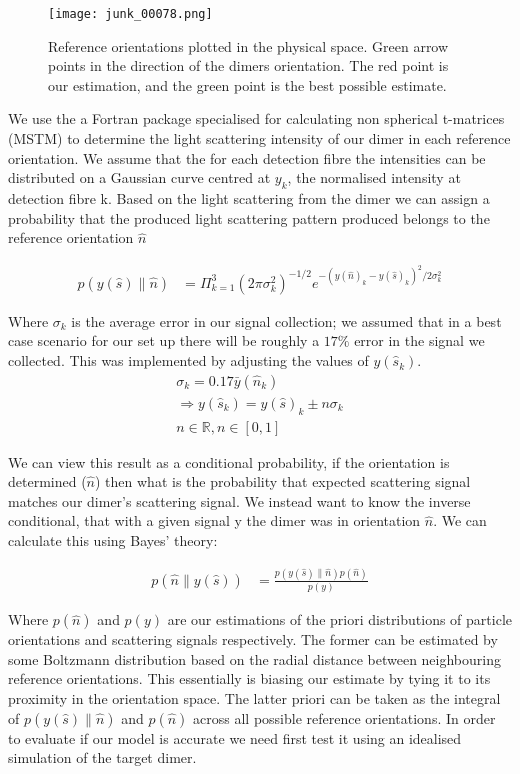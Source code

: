 \documentclass[11pt]{article}
\begin{document}
	\begin{figure}[t]
		\centering
		\texttt{[image: junk\_00078.png]}
		\caption{Reference orientations plotted in the physical space. Green arrow points in the direction of the dimers orientation. The red point is our estimation, and the green point is the best possible estimate.}
	\end{figure}
	
	We use the a Fortran package specialised for calculating non spherical t-matrices (MSTM) \cite{MSTM} to determine the light scattering intensity of our dimer in each reference orientation. We assume that the for each detection fibre the intensities can be distributed on a Gaussian curve centred at $y_k$, the normalised intensity at detection fibre k. Based on the light scattering from the dimer we can assign a probability that the produced light scattering pattern produced belongs to the reference orientation $\hat{n}$
	
	\begin{align}
		p(y(\hat{s})\parallel\hat{n})&= \Pi^3_{k=1} 
		(2\pi\sigma_k^2)^{-1/2} e^{-(y(\hat{n})_k-y(\hat{s})_k)^2/2\sigma_k^2}
	\end{align}
	
	Where $\sigma_k$ is the average error in our signal collection; we assumed that in a best case scenario for our set up there will be roughly a $17\%$ error in the signal we collected. This was implemented by adjusting the values of $y(\hat{s}_k)$. 
	\begin{eqnarray*}
		\sigma_k = 0.17\bar{y}(\hat{n}_k) \\
		\Rightarrow y(\hat{s}_k) = y(\hat{s})_k \pm n\sigma_k \\ 
		n \in \mathbb{R}, n\in[0,1]
	\end{eqnarray*}
	
	We can view this result as a conditional probability, if the orientation is determined ($\hat{n}$) then what is the probability that expected scattering signal matches our dimer's scattering signal. We instead want to know the inverse conditional, that with a given signal y the dimer was in orientation $\hat{n}$. We can calculate this using Bayes' theory:
	
	\begin{align}
		p(\hat{n}\parallel y(\hat{s}))&= \frac{p(y(\hat{s})\parallel\hat{n})p(\hat{n})}{p(y)}
	\end{align}
	
	Where $p(\hat{n})$ and $p(y)$ are our estimations of the priori distributions of particle orientations and scattering signals respectively. The former can be estimated by some Boltzmann distribution based on the radial distance between neighbouring reference orientations. This essentially is biasing our estimate by tying it to its proximity in the orientation space. The latter priori can be taken as the integral of  $p(y(\hat{s})\parallel \hat{n})$ and $p(\hat{n})$ across all possible reference orientations. In order to evaluate if our model is accurate we need first test it using an idealised simulation of the target dimer. 
	
\end{document}
